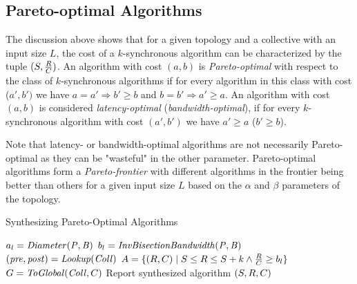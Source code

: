 \subsection{Pareto-optimal Algorithms}
\label{sec:pareto:optimal}
The discussion above shows that for a given topology and a collective with an input size $L$, the cost of a $k$-synchronous algorithm can be characterized by the tuple $(S, \frac{R}{C})$. An algorithm with cost $(a,b)$ is {\em Pareto-optimal} with respect to the class of $k$-synchronous algorithms if for every algorithm in this class with cost  ($a', b')$ we have $a = a' \Rightarrow b' \geq b$ and $b = b' \Rightarrow a' \geq a$. 
An algorithm with cost $(a,b)$ is considered {\em latency-optimal} ({\em bandwidth-optimal}), if for every $k$-synchronous algorithm with cost 
$(a',b')$ we have $a' \geq a$ ($b' \geq b$). 

Note that latency- or bandwidth-optimal algorithms are not necessarily Pareto-optimal as they can be "wasteful" in the other parameter. Pareto-optimal algorithms form a {\em Pareto-frontier} with different algorithms in the frontier being better than others for a given input size $L$ based on the $\alpha$ and $\beta$ parameters of the topology. 

\begin{algorithm}
	\caption{Synthesizing Pareto-Optimal Algorithms} 
    \begin{algorithmic}[1]    
        \State $a_l = \mathit{Diameter(P, B)}$
        \State $b_l = \mathit{InvBisectionBandwidth(P, B)}$
        \State $(\mathit{pre}, \mathit{post}) = \mathit{Lookup(Coll)}$ 
            \State $A = \{(R,C) \mid S \leq R \leq S+k \wedge \frac{R}{C} \geq b_l\}$
                \State $G=\mathit{ToGlobal}(\mathit{Coll},C)$
                \State Report synthesized algorithm $(S,R,C)$
                \EndIf
                \EndIf
			\EndFor
        \EndFor
        \EndProcedure
	\end{algorithmic} 
\end{algorithm}


